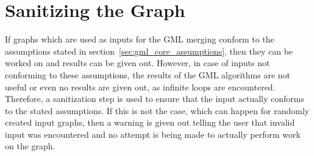 \documentclass[a4paper,12pt,twoside,BCOR=10mm]{scrbook}
\begin{document}
\section{Sanitizing the Graph}

If graphs which are used as inputs for the GML merging conform to the assumptions 
stated in section~\ref{sec:gml_core_assumptions}, 
then they can be worked on and results can be given out. 
However, in case of inputs not conforming to these assumptions, the results of the GML algorithms 
are not useful or even no results are given out, as infinite loops are encountered. 
Therefore, a sanitization step is used to ensure that the input actually conforms to the 
stated assumptions. If this is not the case, which can happen for randomly created input graphs, 
then a warning is given out telling the user that invalid input was encountered and 
no attempt is being made to actually perform work on the graph.
\end{document}
